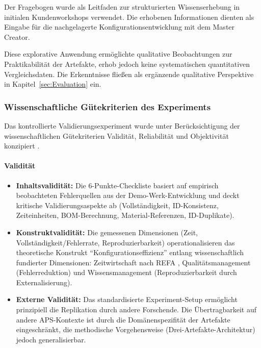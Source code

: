 Der Fragebogen wurde als Leitfaden zur strukturierten Wissenserhebung in initialen Kundenworkshops verwendet. Die erhobenen Informationen dienten als Eingabe für die nachgelagerte Konfigurationsentwicklung mit dem Master Creator.

Diese explorative Anwendung ermöglichte qualitative Beobachtungen zur Praktikabilität der Artefakte, erhob jedoch keine systematischen quantitativen Vergleichsdaten. Die Erkenntnisse fließen als ergänzende qualitative Perspektive in Kapitel~\ref{sec:Evaluation} ein.

\subsubsection{Wissenschaftliche Gütekriterien des Experiments}
\label{subsubsec:Guetekriterien}

Das kontrollierte Validierungsexperiment wurde unter Berücksichtigung der wissenschaftlichen Gütekriterien Validität, Reliabilität und Objektivität konzipiert \citep{gothesis:methodikteil}.

\paragraph{Validität}

\begin{itemize}
    \item \textbf{Inhaltsvalidität:} Die 6-Punkte-Checkliste basiert auf empirisch beobachteten Fehlerquellen aus der Demo-Werk-Entwicklung und deckt kritische Validierungsaspekte ab (Vollständigkeit, ID-Konsistenz, Zeiteinheiten, BOM-Berechnung, Material-Referenzen, ID-Duplikate).

    \item \textbf{Konstruktvalidität:} Die gemessenen Dimensionen (Zeit, Vollständigkeit/Fehlerrate, Reproduzierbarkeit) operationalisieren das theoretische Konstrukt ``Konfigurationseffizienz'' entlang wissenschaftlich fundierter Dimensionen: Zeitwirtschaft nach REFA \citep{REFA2012}, Qualitätsmanagement (Fehlerreduktion) und Wissensmanagement (Reproduzierbarkeit durch Externalisierung).

    \item \textbf{Externe Validität:} Das standardisierte Experiment-Setup ermöglicht prinzipiell die Replikation durch andere Forschende. Die Übertragbarkeit auf andere APS-Kontexte ist durch die Domänenspezifität der Artefakte eingeschränkt, die methodische Vorgehensweise (Drei-Artefakte-Architektur) jedoch generalisierbar.
\end{itemize}

